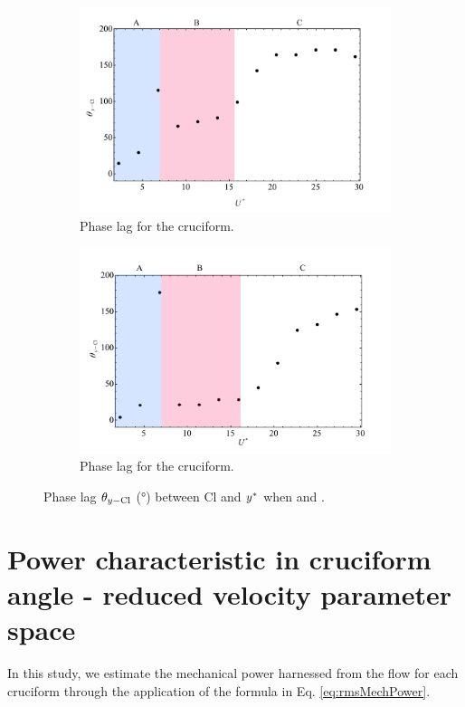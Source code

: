 \documentclass[oneside]{utmthesis}
\begin{document}
\begin{figure}
  \centering
  \begin{subfigure}[h]{1\textwidth}
    \includegraphics[width=\textwidth]{figs/phaseLag2}
    \caption{Phase lag for the \angtw{} cruciform.}
    \label{fig:phaseLag225deg}
  \end{subfigure}
  
  \begin{subfigure}[h]{1\textwidth}
    \includegraphics[width=\textwidth]{figs/phaseLag1}
    \caption{Phase lag for the \angon{} cruciform.}
    \label{fig:phaseLag00deg}
  \end{subfigure}

  \caption{Phase lag $\theta_{y-\text{Cl}}$ (\si{\degree}) between Cl and $y^{*}$ when \angtw{} and \angon{}.}
  \label{fig:phaseLag22500deg}
\end{figure}

\section{Power characteristic in cruciform angle - reduced velocity parameter space}\label{sec:powerCharacteristic}
In this study, we estimate the mechanical power harnessed from the flow for each cruciform through the application of the formula in Eq. \ref{eq:rmsMechPower}.
\end{document}
